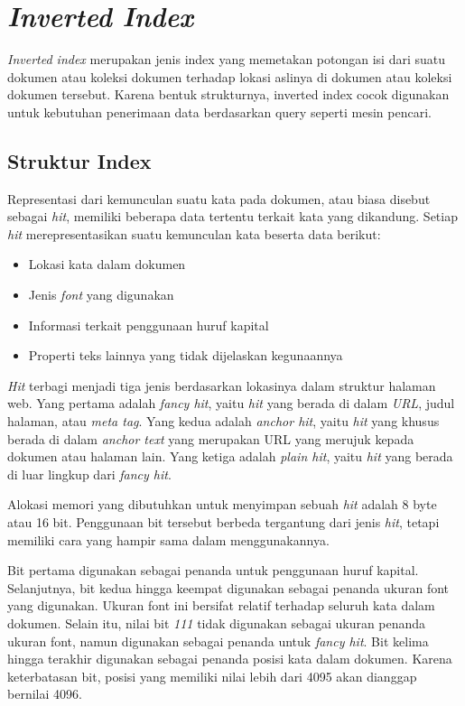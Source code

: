 \section{\emph{Inverted Index}}

\emph{Inverted index} merupakan jenis index yang memetakan potongan isi dari
suatu dokumen atau koleksi dokumen terhadap lokasi aslinya di dokumen atau
koleksi dokumen tersebut. Karena bentuk strukturnya, inverted index cocok
digunakan untuk kebutuhan penerimaan data berdasarkan query seperti mesin
pencari.

\subsection{Struktur Index}

Representasi dari kemunculan suatu kata pada dokumen, atau biasa disebut sebagai
\emph{hit}, memiliki beberapa data tertentu terkait kata yang dikandung. Setiap
\emph{hit} merepresentasikan suatu kemunculan kata beserta data berikut:

\begin{itemize}
  \item{Lokasi kata dalam dokumen}
  \item{Jenis \emph{font} yang digunakan}
  \item{Informasi terkait penggunaan huruf kapital}
  \item{Properti teks lainnya yang tidak dijelaskan kegunaannya}
\end{itemize}

\emph{Hit} terbagi menjadi tiga jenis berdasarkan lokasinya dalam struktur
halaman web. Yang pertama adalah \emph{fancy hit}, yaitu \emph{hit} yang berada
di dalam \emph{URL}, judul halaman, atau \emph{meta tag}. Yang kedua adalah
\emph{anchor hit}, yaitu \emph{hit} yang khusus berada di dalam
\emph{anchor text} yang merupakan URL yang merujuk kepada dokumen atau halaman
lain. Yang ketiga adalah \emph{plain hit}, yaitu \emph{hit} yang berada di luar
lingkup dari \emph{fancy hit}.

Alokasi memori yang dibutuhkan untuk menyimpan sebuah \emph{hit} adalah 8 byte
atau 16 bit. Penggunaan bit tersebut berbeda tergantung dari jenis \emph{hit},
tetapi memiliki cara yang hampir sama dalam menggunakannya. 

Bit pertama digunakan sebagai penanda untuk penggunaan huruf kapital.
Selanjutnya, bit kedua hingga keempat digunakan sebagai penanda ukuran font yang
digunakan. Ukuran font ini bersifat relatif terhadap seluruh kata dalam dokumen.
Selain itu, nilai bit \emph{111} tidak digunakan sebagai ukuran penanda ukuran
font, namun digunakan sebagai penanda untuk \emph{fancy hit}. Bit kelima hingga
terakhir digunakan sebagai penanda posisi kata dalam dokumen. Karena
keterbatasan bit, posisi yang memiliki nilai lebih dari 4095 akan dianggap
bernilai 4096.

